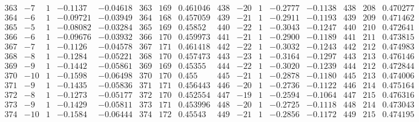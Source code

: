 \documentclass[11pt,reqno,a4letter]{article}
\numberwithin{figure}{section}
\numberwithin{table}{section}
\theoremstyle{plain}
\numberwithin{theorem}{section}
\theoremstyle{definition}
\begin{document}
\begin{table}[ht]
\begin{equation*}
{\begin{array}{ccccc|ccc|ccccc|ccc}
 363 & -7 & 1 & -0.1137 & -0.04618 & 363 & 169 & 0.461046 & 438 & -20 & 1 & -0.2777 & -0.1138 & 438 & 208 & 0.470277 \\
 364 & -6 & 1 & -0.09721 & -0.03949 & 364 & 168 & 0.457059 & 439 & -21 & 1 & -0.2911 & -0.1193 & 439 & 209 & 0.471462 \\
 365 & -5 & 1 & -0.08082 & -0.03284 & 365 & 169 & 0.45852 & 440 & -22 & 1 & -0.3043 & -0.1247 & 440 & 210 & 0.472641 \\
 366 & -6 & 1 & -0.09676 & -0.03932 & 366 & 170 & 0.459973 & 441 & -21 & 1 & -0.2900 & -0.1189 & 441 & 211 & 0.473815 \\
 367 & -7 & 1 & -0.1126 & -0.04578 & 367 & 171 & 0.461418 & 442 & -22 & 1 & -0.3032 & -0.1243 & 442 & 212 & 0.474983 \\
 368 & -8 & 1 & -0.1284 & -0.05221 & 368 & 170 & 0.457473 & 443 & -23 & 1 & -0.3164 & -0.1297 & 443 & 213 & 0.476146 \\
 369 & -9 & 1 & -0.1442 & -0.05861 & 369 & 169 & 0.45355 & 444 & -22 & 1 & -0.3020 & -0.1239 & 444 & 212 & 0.472844 \\
 370 & -10 & 1 & -0.1598 & -0.06498 & 370 & 170 & 0.455 & 445 & -21 & 1 & -0.2878 & -0.1180 & 445 & 213 & 0.474006 \\
 371 & -9 & 1 & -0.1435 & -0.05836 & 371 & 171 & 0.456443 & 446 & -20 & 1 & -0.2736 & -0.1122 & 446 & 214 & 0.475164 \\
 372 & -8 & 1 & -0.1273 & -0.05177 & 372 & 170 & 0.452554 & 447 & -19 & 1 & -0.2594 & -0.1064 & 447 & 215 & 0.476316 \\
 373 & -9 & 1 & -0.1429 & -0.05811 & 373 & 171 & 0.453996 & 448 & -20 & 1 & -0.2725 & -0.1118 & 448 & 214 & 0.473043 \\
 374 & -10 & 1 & -0.1584 & -0.06444 & 374 & 172 & 0.45543 & 449 & -21 & 1 & -0.2856 & -0.1172 & 449 & 215 & 0.474195 \\
\end{array}
}
\end{equation*}

\end{table} 

\clearpage 
\end{document}
